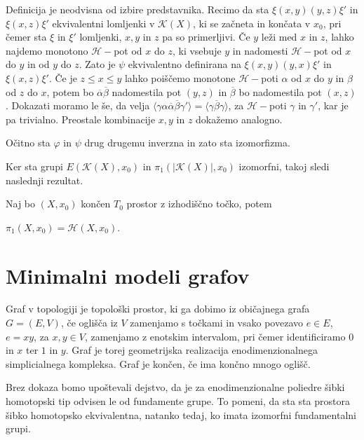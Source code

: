 \documentclass[mat1]{fmfdelo}
\DeclareRobustCommand{\h}{
    \mathcal{H}}
\DeclareRobustCommand{\pot}{
    $\h-$pot
}
\begin{document}
\begin{dokaz}
Definicija je neodvisna od izbire predstavnika. Recimo da sta $\xi(x,y)(y,z)\xi'$ in $\xi(x,z)\xi'$ ekvivalentni lomljenki v $\mathcal{K}(X)$, ki se začneta in končata v $x_0$, pri čemer sta $\xi$ in $\xi'$ lomljenki, $x,y$ in $z$ pa so primerljivi.
Če $y$ leži med $x$ in $z$, lahko najdemo monotono $\mathcal{H}-$pot od $x$ do $z$, ki vsebuje $y$ in nadomesti \pot od $x$ do $y$ in od $y$ do $z$. Zato je $\psi$ ekvivalentno definirana na $\xi(x,y)(y,x)\xi'$ in $\xi(x,z)\xi'$.
Če je $z\leq x \leq y$ lahko poiščemo monotone $\mathcal{H}-$poti $\alpha$ od $x$ do $y$ in $\beta$ od $z$ do $x$, potem bo $\overline{\alpha}\overline{\beta}$ nadomestila pot $(y,z)$ in $\overline{\beta}$ bo nadomestila pot $(x,z)$. Dokazati moramo le še, da velja $\langle\gamma \alpha \overline{\alpha}\overline{\beta}\gamma'\rangle=\langle \gamma\overline{\beta}\gamma\rangle$, za $\h-$poti $\gamma$ in $\gamma'$, kar je pa trivialno. Preostale kombinacije $x,y$ in $z$ dokažemo analogno.

Očitno sta $\varphi$ in $\psi$ drug drugemu inverzna in zato sta izomorfizma.
\end{dokaz}

Ker sta grupi $E(\mathcal{K}(X),x_0)$ in $\pi_1(|\mathcal{K}(X)|,x_0)$ izomorfni, takoj sledi naslednji rezultat.

\begin{posledica}
    Naj bo $(X,x_0)$ končen $T_0$ prostor z izhodiščno točko, potem 
    
    $\pi_1(X,x_0)=\mathscr{H}(X,x_0)$.
\end{posledica}

\section{Minimalni modeli grafov}

Graf v topologiji je topološki prostor, ki ga dobimo iz običajnega grafa 
$G=(E,V)$, če oglišča iz $V$ zamenjamo s točkami in vsako povezavo $e\in 
E$, $e=xy$, za $x,y\in V$, zamenjamo z enotskim intervalom, pri čemer 
identificiramo $0$ in $x$ ter $1$ in $y$.
Graf je torej geometrijska realizacija enodimenzionalnega simplicialnega 
kompleksa. Graf je končen, če ima končno mnogo oglišč. 

Brez dokaza bomo upoštevali dejstvo, da je za enodimenzionalne poliedre 
šibki homotopski tip odvisen le od fundamente grupe. To pomeni, da sta 
sta prostora šibko homotopsko ekvivalentna, natanko tedaj, ko imata 
izomorfni fundamentalni grupi.
\end{document}
